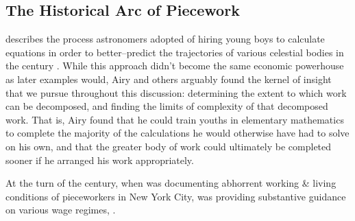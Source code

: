 \documentclass[trackingWork]{subfiles}
\begin{document}
\subsection{The Historical Arc of Piecework}\label{sec:pieceworkArc}
\citeauthor{grier2013computers} describes the process astronomers adopted of hiring young boys
to calculate equations in order
to better--predict the trajectories of various celestial bodies in the  century
\cite{grier2013computers}.
While this approach didn't become the same economic powerhouse as later examples would,
Airy  and others arguably found the kernel of insight that we pursue throughout this discussion:
determining the extent to which work can be decomposed, and
finding the limits of complexity of that decomposed work.
That is, Airy found that he could train youths in elementary mathematics
to complete the majority of the calculations he would otherwise have had to solve on his own,
and that the greater body of work could ultimately be completed sooner
if he arranged his work appropriately.


At the turn of the  century,
when \citeauthor{riisOtherSideLives} was documenting abhorrent working \& living conditions of pieceworkers in New York City,
\citeauthor{norton1900textile} was providing substantive guidance on various wage regimes,
\cite{riisOtherSideLives,norton1900textile}.
\end{document}
